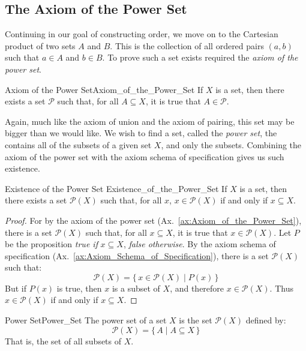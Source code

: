     \subsection{The Axiom of the Power Set}
        Continuing in our goal of constructing order, we move on to the
        Cartesian product of two sets $A$ and $B$. This is the collection of
        all ordered pairs $(a,b)$ such that $a\in{A}$ and $b\in{B}$. To prove
        such a set exists required the \textit{axiom of the power set}.
        \begin{faxiom}{Axiom of the Power Set}{Axiom_of_the_Power_Set}
            If $X$ is a set, then there exists a set $\mathscr{P}$ such that,
            for all $A\subseteq{X}$, it is true that $A\in\mathscr{P}$.
        \end{faxiom}
        Again, much like the axiom of union and the axiom of pairing, this
        set may be bigger than we would like. We wish to find a set, called
        the \textit{power set}, the contains all of the subsets of a given
        set $X$, and only the subsets. Combining the axiom of the power set
        with the axiom schema of specification gives us such existence.
        \begin{ltheorem}{Existence of the Power Set}
                        {Existence_of_the_Power_Set}
            If $X$ is a set, then there exists a set $\mathcal{P}(X)$
            such that, for all $x$, $x\in\mathcal{P}(X)$ if and only
            if $x\subseteq{X}$.
        \end{ltheorem}
        \begin{proof}
            For by the axiom of the power set
            (Ax.~\ref{ax:Axiom_of_the_Power_Set}), there is a set
            $\mathscr{P}(X)$ such that, for all $x\subseteq{X}$, it is true
            that $x\in\mathscr{P}(X)$. Let $P$ be the proposition
            \textit{true if} $x\subseteq{X}$, \textit{false otherwise}. By the
            axiom schema of specification
            (Ax.~\ref{ax:Axiom_Schema_of_Specification}), there is a set
            $\mathcal{P}(X)$ such that:
            \begin{equation}
                \mathcal{P}(X)=\{\,x\in\mathscr{P}(X)\;|\;P(x)\,\}
            \end{equation}
            But if $P(x)$ is true, then $x$ is a subset of $X$, and therefore
            $x\in\mathscr{P}(X)$. Thus $x\in\mathcal{P}(X)$ if and only if
            $x\subseteq{X}$.
        \end{proof}
        \begin{fdefinition}{Power Set}{Power_Set}
            The power set of a set $X$ is the set $\mathcal{P}(X)$ defined by:
            \begin{equation}
                \mathcal{P}(X)=\{\,A\;|\;A\subseteq{X}\,\}
            \end{equation}
            That is, the set of all subsets of $X$.
        \end{fdefinition}
